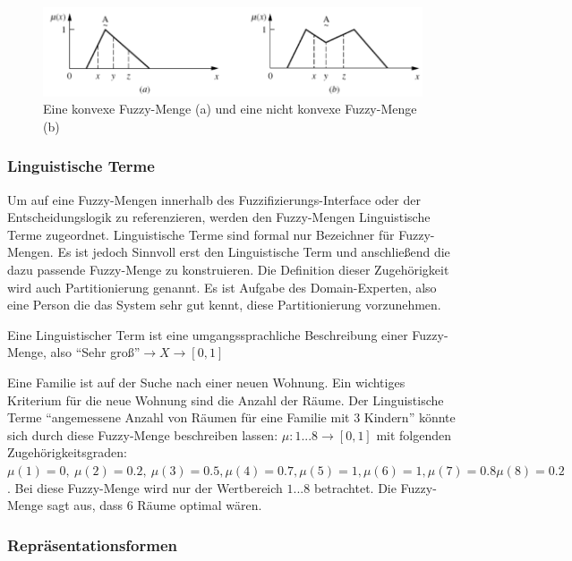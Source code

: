 \documentclass[12pt,a4paper,bibliography=totocnumbered,listof=totocnumbered, abstracton]{scrartcl}
\theoremstyle{Umgebung}
\begin{document}
\begin{figure}
	\centering
	\includegraphics[width=0.7\linewidth]{img/convex}
	\caption{Eine konvexe Fuzzy-Menge (a) und eine nicht konvexe Fuzzy-Menge (b)}
	\label{fig:convex}
\end{figure}


\subsubsection{Linguistische Terme}

Um auf eine Fuzzy-Mengen innerhalb des Fuzzifizierungs-Interface oder der Entscheidungslogik zu referenzieren, werden den Fuzzy-Mengen Linguistische Terme zugeordnet. Linguistische Terme sind formal nur Bezeichner für Fuzzy-Mengen. Es ist jedoch Sinnvoll erst den Linguistische Term und anschließend die dazu passende Fuzzy-Menge zu konstruieren. Die Definition dieser Zugehörigkeit wird auch Partitionierung genannt. Es ist Aufgabe des Domain-Experten, also eine Person die das System sehr gut kennt, diese Partitionierung vorzunehmen.


\begin{defnt}
Eine Linguistischer Term ist eine umgangssprachliche Beschreibung einer Fuzzy-Menge, also \enquote{Sehr groß}$\rightarrow X \rightarrow \left[0,1\right]$
\end{defnt}


\begin{bsp} 
Eine Familie ist auf der Suche nach einer neuen Wohnung. Ein wichtiges Kriterium für die neue Wohnung sind die Anzahl der Räume. Der Linguistische Terme \enquote{angemessene Anzahl von Räumen für eine Familie mit 3 Kindern} könnte sich durch diese Fuzzy-Menge beschreiben lassen: $\mu: {1...8} \rightarrow  \left[0,1\right]$ mit folgenden Zugehörigkeitsgraden: $\mu(1) = 0,\:\mu(2) = 0.2,\:\mu(3) = 0.5, \mu(4) = 0.7,\mu(5) = 1, \mu(6) = 1, \mu(7) = 0.8
\mu(8) = 0.2$. Bei diese Fuzzy-Menge wird nur der Wertbereich $1...8$ betrachtet. Die Fuzzy-Menge sagt aus, dass 6 Räume optimal wären.
\end{bsp} 

\label{representationsformen}
\subsubsection{Repräsentationsformen}
\end{document}
